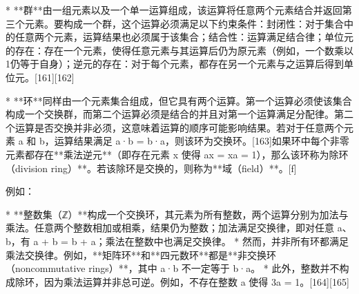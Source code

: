 * **群**由一组元素以及一个单一运算组成，该运算将任意两个元素结合并返回第三个元素。要构成一个群，这个运算必须满足以下约束条件：封闭性：对于集合中的任意两个元素，运算结果也必须属于该集合；结合性：运算满足结合律；单位元的存在：存在一个元素，使得任意元素与其运算后仍为原元素（例如，一个数乘以1仍等于自身）；逆元的存在：对于每个元素，都存在另一个元素与之运算后得到单位元。[161][162]

* **环**同样由一个元素集合组成，但它具有两个运算。第一个运算必须使该集合构成一个交换群，而第二个运算必须是结合的并且对第一个运算满足分配律。第二个运算是否交换并非必须，这意味着运算的顺序可能影响结果。若对于任意两个元素 a 和 b，运算结果满足 a·b = b·a，则该环为交换环。[163]如果环中每个非零元素都存在**乘法逆元**（即存在元素 x 使得 ax = xa = 1），那么该环称为除环（division ring）**。若该除环是交换的，则称为**域（field）**。[f]

例如：

* **整数集（ℤ）**构成一个交换环，其元素为所有整数，两个运算分别为加法与乘法。任意两个整数相加或相乘，结果仍为整数；加法满足交换律，即对任意 a、b，有 a + b = b + a；乘法在整数中也满足交换律。
* 然而，并非所有环都满足乘法交换律。例如，**矩阵环**和**四元数环**都是**非交换环（noncommutative rings）**，其中 a·b 不一定等于 b·a。
* 此外，整数并不构成除环，因为乘法运算并非总可逆。例如，不存在整数 a 使得 3a = 1。[164][165]
